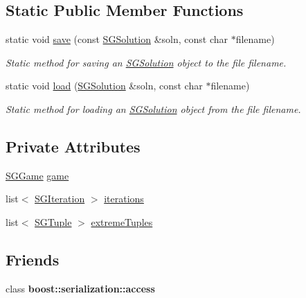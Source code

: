 \subsection*{Static Public Member Functions}
\begin{DoxyCompactItemize}
\item 
\mbox{\label{classSGSolution_a9b68d89b32ad1f70a69912bbe414f73b}} 
static void \hyperlink{classSGSolution_a9b68d89b32ad1f70a69912bbe414f73b}{save} (const \hyperlink{classSGSolution}{S\+G\+Solution} \&soln, const char $\ast$filename)
\begin{DoxyCompactList}\small\item\em Static method for saving an \hyperlink{classSGSolution}{S\+G\+Solution} object to the file filename. \end{DoxyCompactList}\item 
\mbox{\label{classSGSolution_a1a26602ae51e5dd9186d4f358f66ae4b}} 
static void \hyperlink{classSGSolution_a1a26602ae51e5dd9186d4f358f66ae4b}{load} (\hyperlink{classSGSolution}{S\+G\+Solution} \&soln, const char $\ast$filename)
\begin{DoxyCompactList}\small\item\em Static method for loading an \hyperlink{classSGSolution}{S\+G\+Solution} object from the file filename. \end{DoxyCompactList}\end{DoxyCompactItemize}
\subsection*{Private Attributes}
\begin{DoxyCompactItemize}
\item 
\hyperlink{classSGGame}{S\+G\+Game} \hyperlink{classSGSolution_a7358a0ff1476b3dd1eefaa96f2efd8ed}{game}
\item 
list$<$ \hyperlink{classSGIteration}{S\+G\+Iteration} $>$ \hyperlink{classSGSolution_a7216ae67bed2fb1ede826053c1612fcb}{iterations}
\item 
list$<$ \hyperlink{classSGTuple}{S\+G\+Tuple} $>$ \hyperlink{classSGSolution_a8b3448a35113785102b6c5193ab87dc6}{extreme\+Tuples}
\end{DoxyCompactItemize}
\subsection*{Friends}
\begin{DoxyCompactItemize}
\item 
\mbox{\label{classSGSolution_ac98d07dd8f7b70e16ccb9a01abf56b9c}} 
class {\bfseries boost\+::serialization\+::access}
\end{DoxyCompactItemize}


